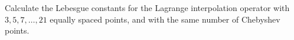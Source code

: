 \begin{problem}
Calculate the Lebesgue constants for the Lagrange interpolation
operator with $3, 5, 7, \dots , 21$ equally spaced points, and with the
same number of Chebyshev points.
\end{problem}


\begin{solution}  

\end{solution}

